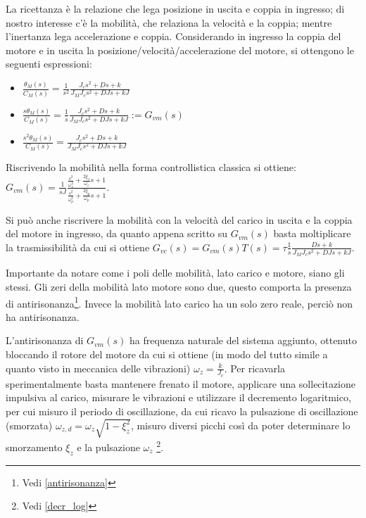 La ricettanza è la relazione che lega posizione in uscita e coppia in ingresso; di nostro interesse c'è la mobilità, che relaziona la velocità e la coppia; mentre l'inertanza lega accelerazione e coppia.
Considerando in ingresso la coppia del motore e in uscita la posizione/velocità/accelerazione del motore, si ottengono le seguenti espressioni:
\begin{itemize}
    \item \(\frac{\theta_M(s)}{C_M(s)} = \frac{1}{s^2} \frac{J_c s^2 + D s + k}{J_M J_c s^2 + D J s + k J} \)
    \item \(\frac{s \theta_M(s)}{C_M(s)} = \frac{1}{s} \frac{J_c s^2 + D s + k}{J_M J_c s^2 + D J s + k J} := G_{vm}(s) \)
    \item \(\frac{s^2 \theta_M(s)}{C_M(s)} = \frac{J_c s^2 + D s + k}{J_M J_c s^2 + D J s + k J} \)
\end{itemize}

Riscrivendo la mobilità nella forma controllistica classica si ottiene:
\(G_{vm}(s) = \frac{1}{sJ} \frac{\frac{s^2}{\omega_z^2} + \frac{2\xi_z}{\omega_z} s + 1}{\frac{s^2}{\omega_p^2} + \frac{2\xi_p}{\omega_p} s + 1}\).

Si può anche riscrivere la mobilità con la velocità del carico in uscita e la coppia del motore in ingresso, da quanto appena scritto su \(G_{vm}(s)\) basta moltiplicare la trasmissibilità da cui si ottiene \(G_{vc}(s) = G_{vm}(s) T(s) = \tau \frac{1}{s} \frac{D s + k}{J_M J_c s^2 + D J s + k J}\).

Importante da notare come i poli delle mobilità, lato carico e motore, siano gli stessi.
Gli zeri della mobilità lato motore sono due, questo comporta la presenza di antirisonanza\footnote{Vedi \ref{antirisonanza}}. Invece la mobilità lato carico ha un solo zero reale, perciò non ha antirisonanza.

L'antirisonanza di \(G_{vm}(s)\) ha frequenza naturale del sistema aggiunto, ottenuto bloccando il rotore del motore da cui si ottiene (in modo del tutto simile a quanto visto in meccanica delle vibrazioni) \(\omega_z=\frac{k}{J_c}\).
Per ricavarla sperimentalmente basta mantenere frenato il motore, applicare una sollecitazione impulsiva al carico, misurare le vibrazioni e utilizzare il decremento logaritmico, per cui misuro il periodo di oscillazione, da cui ricavo la pulsazione di oscillazione (smorzata) \(\omega_{z,d} = \omega_z \sqrt{1-\xi_z^2}\), misuro diversi picchi così da poter determinare lo smorzamento \(\xi_z\) e la pulsazione \(\omega_z\) \footnote{Vedi \ref{decr_log}}.

